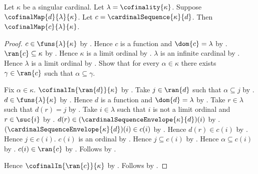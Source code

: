 \begin{proposition}\label{cardinal_sequence_is_cofinal}
    Let $\kappa$ be a singular cardinal.
    Let $\lambda=\cofinality{\kappa}$.
    Suppose $\cofinalMap{d}{\lambda}{\kappa}$.
    Let $c=\cardinalSequence{\kappa}{d}$.
    Then $\cofinalMap{c}{\lambda}{\kappa}$.
\end{proposition}
\begin{proof}
    $c\in\funs{\lambda}{\kappa}$ by .
    Hence $c$ is a function and $\dom{c}=\lambda$
        by .
    $\ran{c}\subseteq\kappa$ by .
    Hence $\kappa$ is a limit ordinal
        by .
    $\lambda$ is an infinite cardinal
        by .
    Hence $\lambda$ is a limit ordinal
        by .
    Show that for every $\alpha\in\kappa$ there exists $\gamma\in\ran{c}$
        such that $\alpha\subseteq\gamma$.
    \begin{subproof}
        Fix $\alpha\in\kappa$.
        $\cofinalIn{\ran{d}}{\kappa}$ by .
        Take $j\in\ran{d}$ such that $\alpha\subseteq j$
            by .
        $d\in\funs{\lambda}{\kappa}$ by .
        Hence $d$ is a function and $\dom{d}=\lambda$
            by .
        Take $r\in\lambda$ such that $d(r)=j$
            by .
        Take $i\in\lambda$ such that $i$ is not a limit ordinal and
            $r\in\suc{i}$ by .
        $d(r)\in(\cardinalSequenceEnvelope{\kappa}{d})(i)$
            by .
        $(\cardinalSequenceEnvelope{\kappa}{d})(i)\in c(i)$
            by .
        Hence $d(r)\in c(i)$
            by .
        Hence $j\in c(i)$.
        $c(i)$ is an ordinal
            by .
        Hence $j\subseteq c(i)$
            by .
        Hence $\alpha\subseteq c(i)$ by .
        $c(i)\in\ran{c}$ by .
        Follows by \auto.
    \end{subproof}
    Hence $\cofinalIn{\ran{c}}{\kappa}$ by .
    Follows by .
\end{proof}

